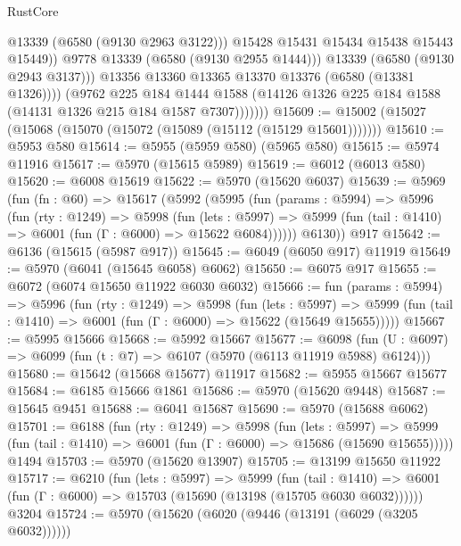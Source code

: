 \begin{lexlean}{RustCore}
\begin{coremodule}
                          @13339
                          (@6580 (@9130 @2963 @3122)))
                        @15428
                        @15431
                        @15434
                        @15438
                        @15443
                        @15449))
                    @9778
                    @13339
                    (@6580 (@9130 @2955 @1444)))
                  @13339
                  (@6580 (@9130 @2943 @3137)))
                @13356
                @13360
                @13365
                @13370
                @13376
                (@6580 (@13381 @1326))))
            (@9762
              @225
              @184
              @1444
              @1588
              (@14126 @1326 @225 @184 @1588 (@14131 @1326 @215 @184 @1587 @7307)))))))
@15609 := @15002 (@15027 (@15068 (@15070 (@15072 (@15089 (@15112 (@15129 @15601)))))))
@15610 := @5953 @580
@15614 := @5955 (@5959 @580) (@5965 @580)
@15615 := @5974 @11916
@15617 := @5970 (@15615 @5989)
@15619 := @6012 (@6013 @580)
@15620 := @6008 @15619
@15622 := @5970 (@15620 @6037)
@15639 := @5969
    (fun (fn : @60) =>
    @15617
      (@5992
        (@5995
          (fun (params : @5994) =>
          @5996
            (fun (rty : @1249) =>
            @5998
              (fun (lets : @5997) =>
              @5999 (fun (tail : @1410) => @6001 (fun (Γ : @6000) => @15622 @6084))))))
        @6130))
    @917
@15642 := @6136 (@15615 (@5987 @917))
@15645 := @6049 (@6050 @917) @11919
@15649 := @5970 (@6041 (@15645 @6058) @6062)
@15650 := @6075 @917
@15655 := @6072 (@6074 @15650 @11922 @6030 @6032)
@15666 := fun (params : @5994) =>
  @5996
    (fun (rty : @1249) =>
    @5998
      (fun (lets : @5997) =>
      @5999 (fun (tail : @1410) => @6001 (fun (Γ : @6000) => @15622 (@15649 @15655)))))
@15667 := @5995 @15666
@15668 := @5992 @15667
@15677 := @6098
    (fun (U : @6097) => @6099 (fun (t : @7) => @6107 (@5970 (@6113 @11919 @5988) @6124)))
@15680 := @15642 (@15668 @15677) @11917
@15682 := @5955 @15667 @15677
@15684 := @6185 @15666 @1861
@15686 := @5970 (@15620 @9448)
@15687 := @15645 @9451
@15688 := @6041 @15687
@15690 := @5970 (@15688 @6062)
@15701 := @6188
    (fun (rty : @1249) =>
    @5998
      (fun (lets : @5997) =>
      @5999 (fun (tail : @1410) => @6001 (fun (Γ : @6000) => @15686 (@15690 @15655)))))
    @1494
@15703 := @5970 (@15620 @13907)
@15705 := @13199 @15650 @11922
@15717 := @6210
    (fun (lets : @5997) =>
    @5999
      (fun (tail : @1410) =>
      @6001 (fun (Γ : @6000) => @15703 (@15690 (@13198 (@15705 @6030 @6032))))))
    @3204
@15724 := @5970 (@15620 (@6020 (@9446 (@13191 (@6029 (@3205 @6032))))))

\end{coremodule}
\end{lexlean}
